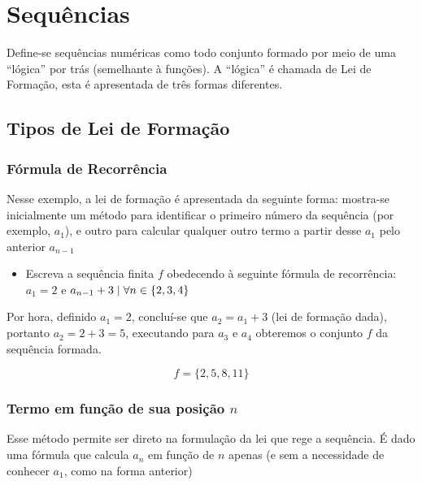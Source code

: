\section{Sequências}

Define-se sequências numéricas como todo conjunto formado por meio de uma ``lógica'' por trás (semelhante à funções). A ``lógica'' é chamada de Lei de Formação, esta é apresentada de três formas diferentes.

\subsection{Tipos de Lei de Formação}

\subsubsection{Fórmula de Recorrência}

Nesse exemplo, a lei de formação é apresentada da seguinte forma: mostra-se inicialmente um método para identificar o primeiro número da sequência (por exemplo, $a_{1}$), e outro para calcular qualquer outro termo a partir desse $a_{1}$ pelo anterior $a_{n - 1}$

\begin{itemize}

  \item Escreva a sequência finita $f$ obedecendo à seguinte fórmula de recorrência: $a_{1} = 2$ e $a_{n - 1} + 3 \hspace{0.1cm} | \hspace{0.1cm} \forall n \in \{2, 3, 4\}$
\end{itemize}

Por hora, definido $a_{1} = 2$, concluí-se que $a_{2} = a_{1} + 3$ (lei de formação dada), portanto $a_{2} = 2 + 3 = 5$, executando para $a_{3}$ e $a_{4}$ obteremos o conjunto $f$ da sequência formada.

\[f = \{2, 5, 8, 11\}\]

\subsubsection{Termo em função de sua posição $n$}

Esse método permite ser direto na formulação da lei que rege a sequência. É dado uma fórmula que calcula $a_{n}$ em função de $n$ apenas (e sem a necessidade de conhecer $a_{1}$, como na forma anterior)


